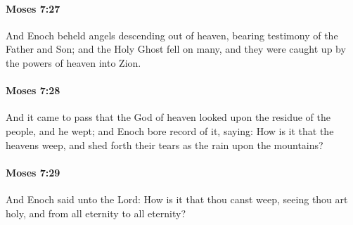 		\paragraph{Moses 7:27} %
			\label{MOSES-7-27}

			And Enoch beheld angels descending out of heaven, bearing testimony of the Father and Son; and the Holy Ghost fell on many, and they were caught up by the powers of heaven into Zion.


		\paragraph{Moses 7:28} %
			\label{MOSES-7-28}

			And it came to pass that the God of heaven looked upon the residue of the people, and he wept; and Enoch bore record of it, saying: How is it that the heavens weep, and shed forth their tears as the rain upon the mountains?


		\paragraph{Moses 7:29} %
			\label{MOSES-7-29}

			And Enoch said unto the Lord: How is it that thou canst weep, seeing thou art holy, and from all eternity to all eternity?


